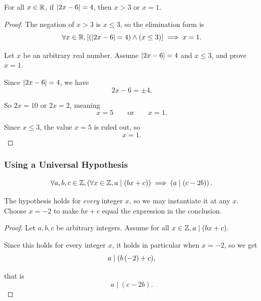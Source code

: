 \begin{proposition}
    For all $x \in \mathbb{R}$, if $\left|2x - 6 \right|= 4$, then $x > 3$ or $x = 1$.
\end{proposition}
\begin{proof}
    The negation of $x > 3$ is $x \leq 3$, so the elimination form is
    \begin{equation*}
        \forall x \in \mathbb{R}, \left[\left(\left|2x - 6\right| = 4\right) \wedge \left(x \leq 3 \right)\right] \implies x = 1.
    \end{equation*}

    Let $x$ be an arbitrary real number. Assume $\left|2x - 6\right| = 4$ and $ x \leq 3$, and prove $x = 1$.

    Since $\left|2x - 6\right| = 4$, we have
    \begin{equation*}
        2x -6 = \pm 4.
    \end{equation*}

    So $2x = 10$ or $2x = 2$, meaning
    \begin{equation*}
        x = 5 \qquad \text{or} \qquad x = 1.
    \end{equation*}

    Since $x \leq 3$, the value $x = 5$ is ruled out, so
    \begin{equation*}
        x = 1.
    \end{equation*}
\end{proof}

\subsubsection{Using a Universal Hypothesis}
\begin{proposition}
    \begin{equation*}
        \forall a, b, c \in \mathbb{Z}, \left(\forall x \in \mathbb{Z}, a \mid \left(bx + c \right)\right) \implies \left(a \mid \left(c - 2b\right)\right).
    \end{equation*}
\end{proposition}
\begin{remark}
    The hypothesis holds for \emph{every} integer $x$, so we may instantiate it at any
    $x$. Choose $x=-2$ to make $bx+c$ equal the expression in the conclusion.
\end{remark}
\begin{proof}
    Let $a, b, c$ be arbitrary integers. Assume for all $x \in \mathbb{Z}, a \mid \left(bx + c\right)$.

    Since this holds for every integer $x$, it holds in particular when $x = -2$, so we get
    \begin{equation*}
        a \mid (b \left(-2 \right) + c),
    \end{equation*}

    that is
    \begin{equation*}
        a \mid (c - 2b).
    \end{equation*}
\end{proof}

